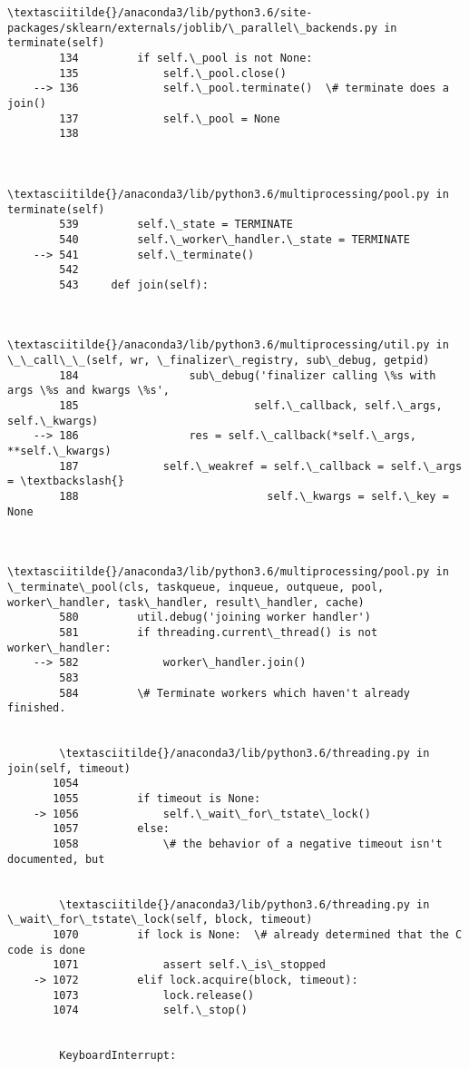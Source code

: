 \documentclass[11pt]{article}
\begin{document}
\begin{Verbatim}[commandchars=\\\{\}]
        \textasciitilde{}/anaconda3/lib/python3.6/site-packages/sklearn/externals/joblib/\_parallel\_backends.py in terminate(self)
        134         if self.\_pool is not None:
        135             self.\_pool.close()
    --> 136             self.\_pool.terminate()  \# terminate does a join()
        137             self.\_pool = None
        138 


        \textasciitilde{}/anaconda3/lib/python3.6/multiprocessing/pool.py in terminate(self)
        539         self.\_state = TERMINATE
        540         self.\_worker\_handler.\_state = TERMINATE
    --> 541         self.\_terminate()
        542 
        543     def join(self):


        \textasciitilde{}/anaconda3/lib/python3.6/multiprocessing/util.py in \_\_call\_\_(self, wr, \_finalizer\_registry, sub\_debug, getpid)
        184                 sub\_debug('finalizer calling \%s with args \%s and kwargs \%s',
        185                           self.\_callback, self.\_args, self.\_kwargs)
    --> 186                 res = self.\_callback(*self.\_args, **self.\_kwargs)
        187             self.\_weakref = self.\_callback = self.\_args = \textbackslash{}
        188                             self.\_kwargs = self.\_key = None


        \textasciitilde{}/anaconda3/lib/python3.6/multiprocessing/pool.py in \_terminate\_pool(cls, taskqueue, inqueue, outqueue, pool, worker\_handler, task\_handler, result\_handler, cache)
        580         util.debug('joining worker handler')
        581         if threading.current\_thread() is not worker\_handler:
    --> 582             worker\_handler.join()
        583 
        584         \# Terminate workers which haven't already finished.


        \textasciitilde{}/anaconda3/lib/python3.6/threading.py in join(self, timeout)
       1054 
       1055         if timeout is None:
    -> 1056             self.\_wait\_for\_tstate\_lock()
       1057         else:
       1058             \# the behavior of a negative timeout isn't documented, but


        \textasciitilde{}/anaconda3/lib/python3.6/threading.py in \_wait\_for\_tstate\_lock(self, block, timeout)
       1070         if lock is None:  \# already determined that the C code is done
       1071             assert self.\_is\_stopped
    -> 1072         elif lock.acquire(block, timeout):
       1073             lock.release()
       1074             self.\_stop()


        KeyboardInterrupt: 

    \end{Verbatim}
\end{document}
